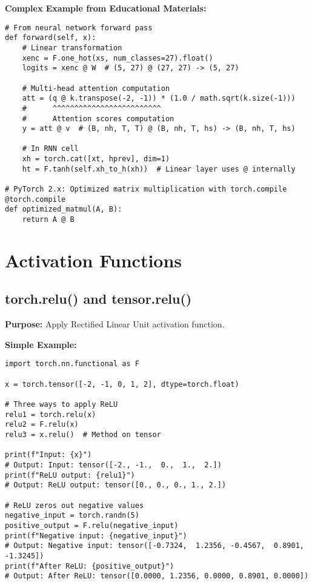 \documentclass[11pt,a4paper]{book}
\begin{document}
\textbf{Complex Example from Educational Materials:}
\begin{verbatim}
# From neural network forward pass
def forward(self, x):
    # Linear transformation
    xenc = F.one_hot(xs, num_classes=27).float()
    logits = xenc @ W  # (5, 27) @ (27, 27) -> (5, 27)
    
    # Multi-head attention computation
    att = (q @ k.transpose(-2, -1)) * (1.0 / math.sqrt(k.size(-1)))
    #      ^^^^^^^^^^^^^^^^^^^^^^^^^
    #      Attention scores computation
    y = att @ v  # (B, nh, T, T) @ (B, nh, T, hs) -> (B, nh, T, hs)
    
    # In RNN cell
    xh = torch.cat([xt, hprev], dim=1)
    ht = F.tanh(self.xh_to_h(xh))  # Linear layer uses @ internally

# PyTorch 2.x: Optimized matrix multiplication with torch.compile
@torch.compile
def optimized_matmul(A, B):
    return A @ B
\end{verbatim}

\section{Activation Functions}

\subsection{torch.relu() and tensor.relu()}

\textbf{Purpose:} Apply Rectified Linear Unit activation function.

\textbf{Simple Example:}
\begin{verbatim}
import torch.nn.functional as F

x = torch.tensor([-2, -1, 0, 1, 2], dtype=torch.float)

# Three ways to apply ReLU
relu1 = torch.relu(x)
relu2 = F.relu(x)
relu3 = x.relu()  # Method on tensor

print(f"Input: {x}")
# Output: Input: tensor([-2., -1.,  0.,  1.,  2.])
print(f"ReLU output: {relu1}")
# Output: ReLU output: tensor([0., 0., 0., 1., 2.])

# ReLU zeros out negative values
negative_input = torch.randn(5)
positive_output = F.relu(negative_input)
print(f"Negative input: {negative_input}")
# Output: Negative input: tensor([-0.7324,  1.2356, -0.4567,  0.8901, -1.3245])
print(f"After ReLU: {positive_output}")
# Output: After ReLU: tensor([0.0000, 1.2356, 0.0000, 0.8901, 0.0000])
\end{verbatim}
\end{document}
